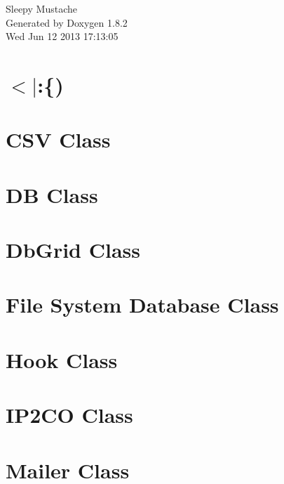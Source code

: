 \documentclass{book}
\begin{document}
\hypersetup{pageanchor=false,citecolor=blue}
\begin{titlepage}
\vspace*{7cm}
\begin{center}
{\Large Sleepy Mustache }\\
\vspace*{1cm}
{\large Generated by Doxygen 1.8.2}\\
\vspace*{0.5cm}
{\small Wed Jun 12 2013 17:13:05}\\
\end{center}
\end{titlepage}
\clearemptydoublepage
{}
\tableofcontents
\clearemptydoublepage
{}
\hypersetup{pageanchor=true,citecolor=blue}
\chapter{$<$$|$\-:\{)}
\label{index}\hypertarget{index}{}
\chapter{C\-S\-V Class}
\label{csv1}
\hypertarget{csv1}{}

\chapter{D\-B Class}
\label{db1}
\hypertarget{db1}{}

\chapter{Db\-Grid Class}
\label{dbgrid1}
\hypertarget{dbgrid1}{}

\chapter{File System Database Class}
\label{fsdb}
\hypertarget{fsdb}{}

\chapter{Hook Class}
\label{hooks1}
\hypertarget{hooks1}{}

\chapter{I\-P2\-C\-O Class}
\label{ip2country}
\hypertarget{ip2country}{}

\chapter{Mailer Class}
\label{mailer1}
\hypertarget{mailer1}{}

\end{document}
